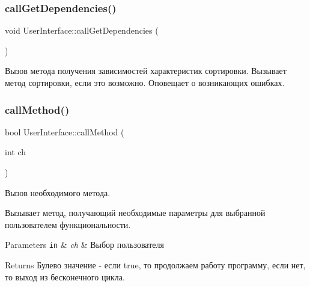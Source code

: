 \subsubsection{\texorpdfstring{call\+Get\+Dependencies()}{callGetDependencies()}}
{\footnotesize\ttfamily void User\+Interface\+::call\+Get\+Dependencies (\begin{DoxyParamCaption}{ }\end{DoxyParamCaption})\hspace{0.3cm}{\ttfamily [private]}}



Вызов метода получения зависимостей характеристик сортировки. Вызывает метод сортировки, если это возможно. Оповещает о возникающих ошибках. 

\hypertarget{class_user_interface_ad388ff348c0a124038f4ea9756b80041}{}\label{class_user_interface_ad388ff348c0a124038f4ea9756b80041} 
\subsubsection{\texorpdfstring{call\+Method()}{callMethod()}}
{\footnotesize\ttfamily bool User\+Interface\+::call\+Method (\begin{DoxyParamCaption}\item[{int}]{ch }\end{DoxyParamCaption})\hspace{0.3cm}{\ttfamily [private]}}



Вызов необходимого метода. 

Вызывает метод, получающий необходимые параметры для выбранной пользователем функциональности. 
\begin{DoxyParams}[1]{Parameters}
\mbox{\tt in}  & {\em ch} & Выбор пользователя \\
\hline
\end{DoxyParams}
\begin{DoxyReturn}{Returns}
Булево значение -\/ если true, то продолжаем работу программу, если нет, то выход из бесконечного цикла. 
\end{DoxyReturn}
\hypertarget{class_user_interface_adcabf6c8f2be4b4ec712c4674156bf59}{}\label{class_user_interface_adcabf6c8f2be4b4ec712c4674156bf59} 
